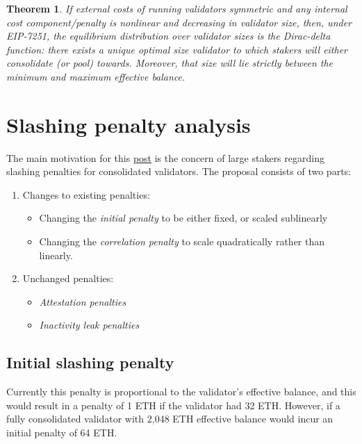 \documentclass{article}
\newtheorem{theorem}{Theorem}
\begin{document}
\begin{theorem}
  If external costs of running validators symmetric and any internal cost
  component/penalty is nonlinear and decreasing in validator size, then, under
  EIP-7251, the equilibrium distribution over validator sizes is the
  Dirac-delta function: there exists a unique optimal size validator to which
  stakers will either consolidate (or pool) towards. Moreover, that size will
  lie strictly between the minimum and maximum effective balance.
\end{theorem}

\section{Slashing penalty analysis}
The main motivation for this
\href{https://notes.ethereum.org/@mikeneuder/slashings-eip-7251}{post} is the
concern of large stakers regarding slashing penalties for consolidated
validators. The proposal consists of two parts:
\begin{enumerate}
  \item Changes to existing penalties:
    \begin{itemize}
      \item Changing the \textit{initial penalty} to be either fixed, or scaled
        sublinearly
      \item Changing the \textit{correlation penalty} to scale quadratically
        rather than linearly.
    \end{itemize}
  \item Unchanged penalties:
    \begin{itemize}
      \item \textit{Attestation penalties}
      \item \textit{Inactivity leak penalties}
    \end{itemize}
\end{enumerate}

\subsection{Initial slashing penalty}
Currently this penalty is proportional to the validator's effective balance,
and this would result in a penalty of 1 ETH if the validator had 32 ETH.
However, if a fully consolidated validator with 2,048 ETH effective balance
would incur an initial penalty of 64 ETH.
\end{document}

